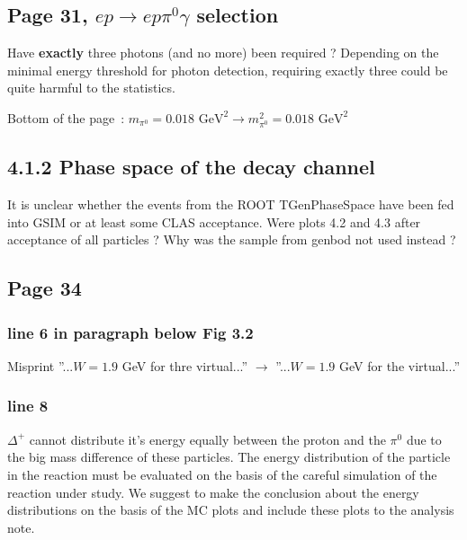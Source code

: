 \documentclass[11pt]{paper}
\begin{document}
\subsection*{Page 31, $ep\rightarrow ep\pi^0\gamma$ selection}

Have {\bf exactly} three photons (and no more) been required ?
Depending on the minimal energy threshold for photon detection, requiring exactly three could be quite harmful to the statistics.

Bottom of the page~: $m_{\pi^0}=0.018\mbox{ GeV}^2\rightarrow m^2_{\pi^0}=0.018\mbox{ GeV}^2$

\subsection*{4.1.2 Phase space of the decay channel}

It is unclear whether the events from the ROOT TGenPhaseSpace have been fed into GSIM or at least some CLAS acceptance.
Were plots 4.2 and 4.3 after acceptance of all particles ?
Why was the sample from genbod not used instead ?


\subsection*{Page 34}
\subsubsection*{line 6 in paragraph below Fig 3.2}
Misprint ''...$W=1.9$ GeV for thre virtual...'' $\rightarrow$ ''...$W=1.9$ GeV for the virtual...''

\subsubsection*{line 8} $\Delta^+$ cannot  distribute it's energy equally between the proton and the $\pi^0$ due to the big mass difference of these particles. 
The energy distribution of the particle in the reaction must be evaluated on the basis of the careful simulation of the reaction under study. 
We suggest to make the conclusion about the energy distributions on the basis of the MC plots and include these plots to the analysis note.  
\end{document}
